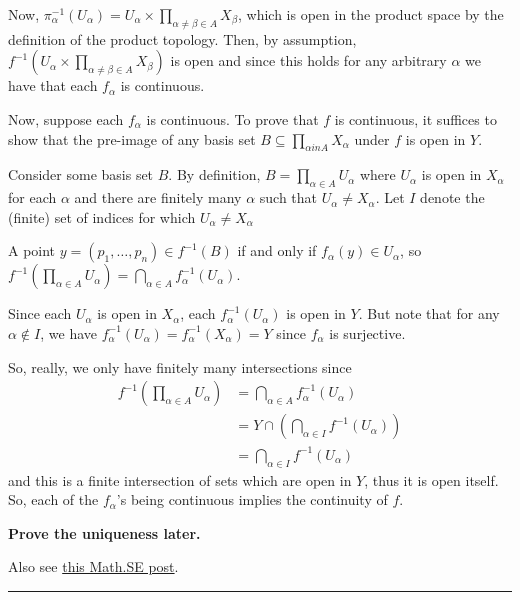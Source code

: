 \documentclass{article}
\begin{document}
\vskip 0.5cm
Now, $\pi_{\alpha}^{-1}(U_{\alpha}) = U_{\alpha} \times \prod_{\alpha \neq \beta \in A} X_{\beta}$, which is open in the product space by the definition of the product topology. Then, by assumption, $f^{-1}(U_{\alpha} \times \prod_{\alpha \neq \beta \in A} X_{\beta})$ is open and since this holds for any arbitrary $\alpha$ we have that each $f_{\alpha}$ is continuous.

\vskip 0.5cm
Now, suppose each $f_{\alpha}$ is continuous. To prove that $f$ is continuous, it suffices to show that the pre-image of any basis set $B \subseteq \prod_{\alpha in A} X_{\alpha}$ under $f$ is open in $Y$. 

\vskip 0.5cm
Consider some basis set $B$. By definition, $B = \prod_{\alpha \in A} U_{\alpha}$ where $U_{\alpha}$ is open in $X_{\alpha}$ for each $\alpha$ and there are finitely many $\alpha$ such that $U_{\alpha} \neq X_{\alpha}$. Let $I$ denote the (finite) set of indices for which $U_{\alpha} \neq X_{\alpha}$

\vskip 0.5cm
A point $y = (p_1, \dots, p_{n}) \in f^{-1}(B)$ if and only if $f_{\alpha}(y) \in U_{\alpha}$, so $f^{-1}(\prod_{\alpha \in A} U_{\alpha}) = \bigcap_{\alpha \in A} f^{-1}_{\alpha}(U_{\alpha})$.

\vskip 0.5cm
Since each $U_{\alpha}$ is open in $X_{\alpha}$, each $f^{-1}_{\alpha}(U_{\alpha})$ is open in $Y$. But note that for any $\alpha \not\in I$, we have $f^{-1}_{\alpha}(U_{\alpha}) = f^{-1}_{\alpha}(X_{\alpha}) = Y$ since $f_{\alpha}$ is surjective.

So, really, we only have finitely many intersections since 
\begin{align*}
  f^{-1}\left(\prod_{\alpha \in A} U_{\alpha}\right) &= \bigcap_{\alpha \in A} f^{-1}_{\alpha}(U_{\alpha}) \\
  &= Y \cap \left( \bigcap_{\alpha \in I} f^{-1}(U_{\alpha}) \right) \\
  &= \bigcap_{\alpha \in I} f^{-1}(U_{\alpha})
\end{align*}
and this is a finite intersection of sets which are open in $Y$, thus it is open itself. So, each of the $f_{\alpha}$'s being continuous implies the continuity of $f$.

\textbf{Prove the uniqueness later.}

\vskip 0.5cm
Also see \href{https://math.stackexchange.com/questions/2106197/question-on-the-characteristic-property-of-infinite-product-spaces}{this Math.SE post}.

\vskip 0.5cm
\hrule
\vskip 0.5cm
\end{document}
